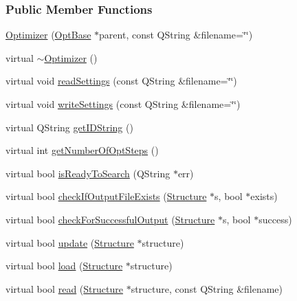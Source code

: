 \subsubsection*{Public Member Functions}
\begin{DoxyCompactItemize}
\item 
\hyperlink{classGlobalSearch_1_1Optimizer_a8c5a3335ff76f8a6a21a160d0139d842}{Optimizer} (\hyperlink{classGlobalSearch_1_1OptBase}{Opt\+Base} $\ast$parent, const Q\+String \&filename=\char`\"{}\char`\"{})
\item 
virtual \hyperlink{classGlobalSearch_1_1Optimizer_ace719aed9bbba0b3a568513ff68f8067}{$\sim$\+Optimizer} ()
\item 
virtual void \hyperlink{classGlobalSearch_1_1Optimizer_afef2dc22aa09df5e50e2f7b4f492091a}{read\+Settings} (const Q\+String \&filename=\char`\"{}\char`\"{})
\item 
virtual void \hyperlink{classGlobalSearch_1_1Optimizer_af67c36d87d7b41b1e91773b519d77829}{write\+Settings} (const Q\+String \&filename=\char`\"{}\char`\"{})
\item 
virtual Q\+String \hyperlink{classGlobalSearch_1_1Optimizer_aa81df016b0c8f3055a5e9e917eaefc75}{get\+I\+D\+String} ()
\item 
virtual int \hyperlink{classGlobalSearch_1_1Optimizer_aeeb18e38fa60535f74b577591400dd60}{get\+Number\+Of\+Opt\+Steps} ()
\item 
virtual bool \hyperlink{classGlobalSearch_1_1Optimizer_a10d37164307814e91c55bf846a59a80b}{is\+Ready\+To\+Search} (Q\+String $\ast$err)
\item 
virtual bool \hyperlink{classGlobalSearch_1_1Optimizer_afb5058a5e6a94e49c249284401680d5f}{check\+If\+Output\+File\+Exists} (\hyperlink{classGlobalSearch_1_1Structure}{Structure} $\ast$s, bool $\ast$exists)
\item 
virtual bool \hyperlink{classGlobalSearch_1_1Optimizer_a8d9373ded1b851ae6fdcbff41ed911cf}{check\+For\+Successful\+Output} (\hyperlink{classGlobalSearch_1_1Structure}{Structure} $\ast$s, bool $\ast$success)
\item 
virtual bool \hyperlink{classGlobalSearch_1_1Optimizer_a7e57844e4e6d713c87e6cf29ea03c5e2}{update} (\hyperlink{classGlobalSearch_1_1Structure}{Structure} $\ast$structure)
\item 
virtual bool \hyperlink{classGlobalSearch_1_1Optimizer_a5a2c5bc75be24ee41c27c1a2fe0e446a}{load} (\hyperlink{classGlobalSearch_1_1Structure}{Structure} $\ast$structure)
\item 
virtual bool \hyperlink{classGlobalSearch_1_1Optimizer_a671035cb8c0afbb4a1755b395bd063bd}{read} (\hyperlink{classGlobalSearch_1_1Structure}{Structure} $\ast$structure, const Q\+String \&filename)

\end{DoxyCompactItemize}
